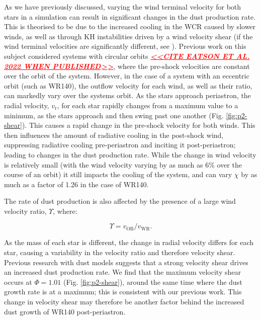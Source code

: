 \documentclass[fleqn,usenatbib]{mnras}
\newcommand{\rms}[1]{\ensuremath{_{\text{#1}}}}
\begin{document}
As we have previously discussed, varying the wind terminal velocity for both stars in a simulation can result in significant changes in the dust production rate.
This is theorised to be due to the increased cooling in the WCR caused by slower winds, as well as through KH instabilities driven by a wind velocity shear (if the wind terminal velocities are significantly different, see \cite{stevens_colliding_1992}).
Previous work on this subject considered systems with circular orbits \textcolor{red}{\underline{\emph{\textbf{<<CITE EATSON ET AL. 2022 WHEN PUBLISHED>>}}}}, where the pre-shock velocities are constant over the orbit of the system.
However, in the case of a system with an eccentric orbit (such as WR140), the outflow velocity for each wind, as well as their ratio, can markedly vary over the systems orbit.
As the stars approach periastron, the radial velocity, $v\rms{r}$, for each star rapidly changes from a maximum value to a minimum, as the stars approach and then swing past one another (Fig. \ref{fig:p2-shear}).
This causes a rapid change in the pre-shock velocity for both winds.
This then influences the amount of radiative cooling in the post-shock wind, suppressing radiative cooling pre-periastron and inciting it post-periastron; leading to changes in the dust production rate. 
While the change in wind velocity is relatively small (with the wind velocity varying by as much as 6\% over the course of an orbit) it still impacts the cooling of the system, and can vary $\chi$ by as much as a factor of 1.26 in the case of WR140.

The rate of dust production is also affected by the presence of a large wind velocity ratio, $\Upsilon$, where:

\begin{equation}
  \Upsilon = v\rms{OB} / v\rms{WR} .
\end{equation}

\noindent
As the mass of each star is different, the change in radial velocity differs for each star, causing a variability in the velocity ratio and therefore velocity shear.
Previous research with dust models suggests that a strong velocity shear drives an increased dust production rate.
We find that the maximum velocity shear occurs at $\Phi = 1.01$ (Fig. \ref{fig:p2-shear}), around the same time where the dust growth rate is at a maximum; this is consistent with our previous work.
This change in velocity shear may therefore be another factor behind the increased dust growth of WR140 post-periastron.
\end{document}

